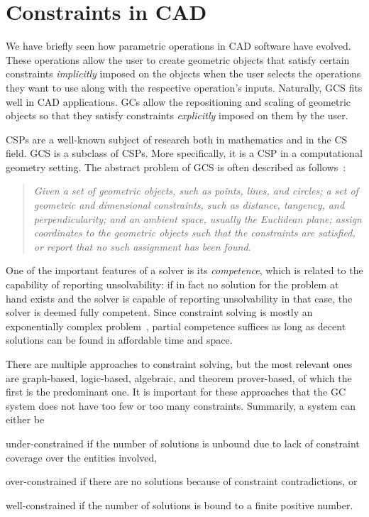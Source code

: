 \section{Constraints in CAD}%
\label{sec:intro.constraints}

We have briefly seen how parametric operations in \ac{CAD} software have
evolved.  These operations allow the user to create geometric objects that
satisfy certain constraints \textit{implicitly} imposed on the objects when the
user selects the operations they want to use along with the respective
operation's inputs.  Naturally, \ac{GCS} fits well in \ac{CAD} applications.
\Acp{GC} allow the repositioning and scaling of geometric objects so that they
satisfy constraints \textit{explicitly} imposed on them by the user.

\acp{CSP} are a well-known subject of research both in mathematics and in the
\ac{CS} field.  \ac{GCS} is a subclass of \acp{CSP}. More specifically, it is a
\ac{CSP} in a computational geometry setting.  The abstract problem of \ac{GCS}
is often described as follows~\cite[pp.~6]{Bettig:2011:GCSPC}:

\begin{quote}
  {\itshape\color{gray}
  Given a set of geometric objects, such as points, lines, and circles; a set of
  geometric and dimensional constraints, such as distance, tangency, and
  perpendicularity; and an ambient space, usually the Euclidean plane; assign
  coordinates to the geometric objects such that the constraints are satisfied,
  or report that no such assignment has been found.}
\end{quote}

One of the important features of a solver is its \textit{competence}, which is
related to the capability of reporting unsolvability: if in fact no solution for
the problem at hand exists and the solver is capable of reporting unsolvability
in that case, the solver is deemed fully competent.  Since constraint solving is
mostly an exponentially complex problem~\cite{Rossi:2006:Handbook}, partial
competence suffices as long as decent solutions can be found in affordable time
and space.

There are multiple approaches to constraint solving, but the most relevant ones
are graph-based, logic-based, algebraic, and theorem prover-based, of which the
first is the predominant one.  It is important for these approaches that the
\ac{GC} system does not have too few or too many constraints.  Summarily, a
system can either be 
\begin{enumerate*}[label= (\arabic*)]
  \item under-constrained if the number of solutions is unbound due to lack of
  constraint coverage over the entities involved,
  \item over-constrained if there are no solutions because of constraint
  contradictions, or
  \item well-constrained if the number of solutions is bound to a finite
  positive number.
\end{enumerate*}

